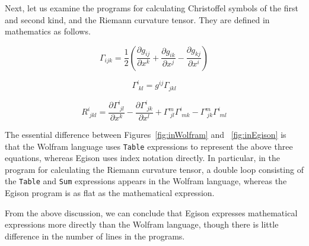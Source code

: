 \documentclass[acmlarge]{acmart}
\begin{document}
Next, let us examine the programs for calculating Christoffel symbols of the first and second kind, and the Riemann curvature tensor.
They are defined in mathematics as follows.

\[\Gamma_{ijk} = \frac{1}{2} (\frac{\partial g_{ij}}{\partial x^k} + \frac{\partial g_{ik}}{\partial x^j} - \frac{\partial g_{kj}}{\partial x^i})\]

\[\Gamma^{i}_{\;kl} = g^{ij} \Gamma_{jkl}\]

\[R^{i}_{\;jkl} = \frac{\partial \Gamma^{i}_{\;jl}}{\partial x^k} - \frac{\partial \Gamma^{i}_{\;jk}}{\partial x^l} + \Gamma^{m}_{\;jl} \Gamma^{i}_{\;mk} - \Gamma^{m}_{\;jk} \Gamma^{i}_{\;ml} \]

The essential difference between Figures~\ref{fig:inWolfram} and ~\ref{fig:inEgison} is that the Wolfram language uses \texttt{Table} expressions to represent the above three equations, whereas Egison uses index notation directly.
In particular, in the program for calculating the Riemann curvature tensor, a double loop consisting of the \texttt{Table} and \texttt{Sum} expressions appears in the Wolfram language, whereas the Egison program is as flat as the mathematical expression.

From the above discussion, we can conclude that Egison expresses mathematical expressions more directly than the Wolfram language, though there is little difference in the number of lines in the programs.
\end{document}
